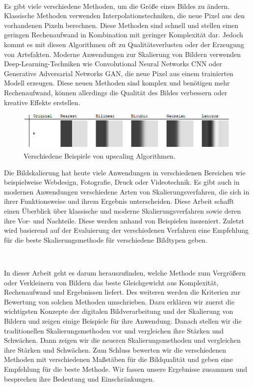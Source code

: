     ~
    
    Es gibt viele verschiedene Methoden, um die Größe eines Bildes zu ändern. 
    Klassische Methoden verwenden Interpolationstechniken, die neue Pixel aus den vorhandenen Pixeln berechnen. 
    Diese Methoden sind schnell und stellen einen geringen Rechenaufwand in Kombination mit geringer Komplexität dar. 
    Jedoch kommt es mit diesen Algorithmen oft zu Qualitätsverlusten oder der Erzeugung von Artefakten. 
    Moderne Anwendungen zur Skalierung von Bildern verwenden Deep-Learning-Techniken wie Convolutional Neural Networks \ac{CNN} oder Generative Adversarial Networks \ac{GAN}, die neue Pixel aus einem trainierten Modell erzeugen. 
    Diese neuen Methoden sind komplex und benötigen mehr Rechenaufwand, können allerdings die Qualität des Bildes verbessern oder kreative Effekte erstellen.
    
    \begin{figure}[h!]
        \vspace{8mm}
        \centering
        \includegraphics{img/xaR8r.png}
        \caption{Verschiedene Beispiele von upscaling Algorithmen\cite{whuber.lanczos}.}
        \label{fig:my_label}
        \vspace{4mm}
    \end{figure}
    
    Die Bildskalierung hat heute viele Anwendungen in verschiedenen Bereichen wie beispielweise Webdesign, Fotografie, Druck oder Videotechnik. 
    Es gibt auch in modernen Anwendungen verschiedene Arten von Skalierungsverfahren, die sich in ihrer Funktionsweise und ihrem Ergebnis unterscheiden. 
    Diese Arbeit schafft einen Überblick über klassische und moderne Skalierungsverfahren sowie deren ihre Vor- und Nachteile. 
    Diese werden anhand von Beispielen inszeniert. 
    Zuletzt wird basierend auf der Evaluierung der verschiedenen Verfahren eine Empfehlung für die beste Skalierungsmethode für verschiedene Bildtypen geben. 
    
    ~
    
    In dieser Arbeit geht es darum herauszufinden, welche Methode zum Vergrößern oder Verkleinern von Bildern das beste Gleichgewicht aus Komplexität, Rechenaufwand und Ergebnissen liefert. 
    Des weiteren werden die Kriterien zur Bewertung von solchen Methoden umschrieben. 
    Dazu erklären wir zuerst die wichtigsten Konzepte der digitalen Bildverarbeitung und der Skalierung von Bildern und zeigen einige Beispiele für ihre Anwendung. Danach stellen wir die traditionellen Skalierungsmethoden vor und vergleichen ihre Stärken und Schwächen. Dann zeigen wir die neueren Skalierungsmethoden und vergleichen ihre Stärken und Schwächen. Zum Schluss bewerten wir die verschiedenen Methoden mit verschiedenen Maßstäben für die Bildqualität und geben eine Empfehlung für die beste Methode. Wir fassen unsere Ergebnisse zusammen und besprechen ihre Bedeutung und Einschränkungen.
    \newpage